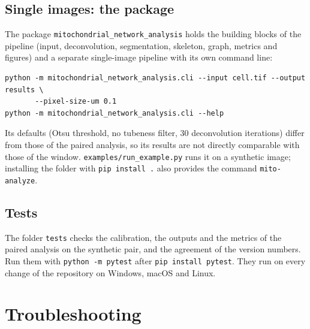 \documentclass[fontsize=10.5pt,paper=a4,parskip=half,headings=normal,numbers=noenddot,
  open=any,captions=tableheading]{scrreprt}
\newcommand{\file}[1]{\texttt{#1}}
\begin{document}
\section{Single images: the package}
The package \file{mitochondrial\_network\_analysis} holds the building blocks of the pipeline (input, deconvolution, segmentation, skeleton, graph, metrics and figures) and a separate single-image pipeline with its own command line:
\begin{verbatim}
python -m mitochondrial_network_analysis.cli --input cell.tif --output results \
       --pixel-size-um 0.1
python -m mitochondrial_network_analysis.cli --help
\end{verbatim}
Its defaults (Otsu threshold, no tubeness filter, 30 deconvolution iterations) differ from those of the paired analysis, so its results are not directly comparable with those of the window. \file{examples/run\_example.py} runs it on a synthetic image; installing the folder with \texttt{pip install .} also provides the command \texttt{mito-analyze}.

\section{Tests}
The folder \file{tests} checks the calibration, the outputs and the metrics of the paired analysis on the synthetic pair, and the agreement of the version numbers. Run them with \texttt{python -m pytest} after \texttt{pip install pytest}. They run on every change of the repository on Windows, macOS and Linux.

\chapter{Troubleshooting}
\end{document}
